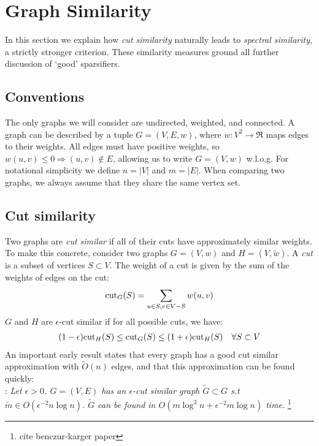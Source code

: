 \documentclass{article}
\begin{document}
\section{Graph Similarity}

In this section we explain how \textit{cut similarity} naturally leads to
\textit{spectral similarity}, a strictly stronger criterion. These
similarity measures ground all further discussion of `good' sparsifiers.

\subsection{Conventions}

The only graphs we will consider are undirected, weighted, and connected. A
graph can be described by a tuple $G = (V, E, w)$, where $w : V^2
\rightarrow \Re$ maps edges to their weights. All edges must have positive
weights, so $w(u, v) \leq 0 \Rightarrow (u, v) \not\in E$, allowing us to
write $G = (V, w)$ w.l.o.g. For notational simplicity we define $n = |V|$
and $m = |E|$. When comparing two graphs, we always assume that they share
the same vertex set.

\subsection{Cut similarity}

Two graphs are \textit{cut similar} if all of their cuts have approximately
similar weights. To make this concrete, consider two graphs $G = (V, w)$ and
$H = (V, \tilde{w})$. A \textit{cut} is a subset of vertices $S \subset V$.
The weight of a cut is given by the sum of the weights of edges on the cut:
\begin{align*}
    \text{cut}_{G}(S) = \sum_{u \in S, v \in V - S} w(u, v)
\end{align*}
$G$ and $H$ are $\epsilon$-cut similar if for all possible cuts, we have:
\begin{align*}
    (1 - \epsilon)\text{cut}_{H}(S) \leq \text{cut}_{G}(S) \leq (1 + \epsilon)\text{cut}_{H}(S)
    \quad \forall{S \subset V}
\end{align*}
An important early result states that every graph has a good cut similar
approximation with $\tilde{O}(n)$ edges, and that this approximation can be
found quickly: \\

\noindent
{}: \textit{Let $\epsilon > 0$. $G =
(V, E)$ has an $\epsilon$-cut similar graph $\tilde{G} \subset G$ s.t
$\tilde{m} \in O(\epsilon^{-2}n\log n)$. $\tilde{G}$ can be found in
$O(m\log^3n + \epsilon^{-2}m\log n)$ time.} \footnote{cite benczur-karger
paper} \\
\end{document}
